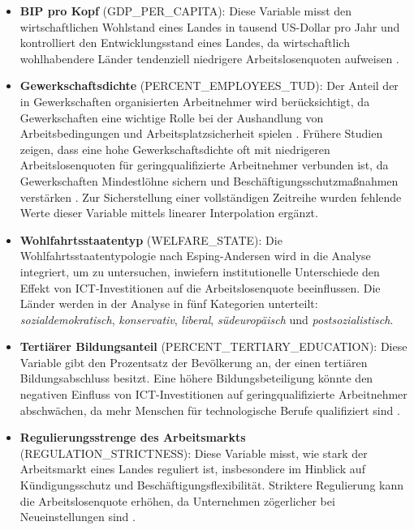 \begin{itemize}
    \item \textbf{\ac{BIP} pro Kopf} (GDP\_PER\_CAPITA): Diese Variable misst den wirtschaftlichen 
    Wohlstand eines Landes in tausend US-Dollar pro Jahr und kontrolliert den Entwicklungsstand 
    eines Landes, da wirtschaftlich wohlhabendere Länder tendenziell niedrigere Arbeitslosenquoten 
    aufweisen \parencite{oecd2022gdp}.
    \item \textbf{Gewerkschaftsdichte} (PERCENT\_EMPLOYEES\_TUD): Der Anteil der in Gewerkschaften 
    organisierten Arbeitnehmer wird berücksichtigt, da Gewerkschaften eine wichtige Rolle bei der 
    Aushandlung von Arbeitsbedingungen und Arbeitsplatzsicherheit spielen \parencite{oecd2022tud}. 
    Frühere Studien zeigen, dass eine hohe Gewerkschaftsdichte oft mit niedrigeren 
    Arbeitslosenquoten für geringqualifizierte Arbeitnehmer verbunden ist, da Gewerkschaften 
    Mindestlöhne sichern und Beschäftigungsschutzmaßnahmen verstärken 
    \parencite[S. 61]{nickell1997unemployment}. Zur Sicherstellung einer vollständigen Zeitreihe 
    wurden fehlende Werte dieser Variable mittels linearer Interpolation ergänzt.
    \item \textbf{Wohlfahrtsstaatentyp} (WELFARE\_STATE): Die Wohlfahrtsstaatentypologie nach 
    Esping-Andersen \parencite{espingandersen1990thethree} wird in die Analyse integriert, 
    um zu untersuchen, inwiefern institutionelle Unterschiede den Effekt von \ac{ICT}-Investitionen 
    auf die Arbeitslosenquote beeinflussen. Die Länder werden in der Analyse in fünf Kategorien 
    unterteilt: \textit{sozialdemokratisch}, \textit{konservativ}, \textit{liberal}, 
    \textit{südeuropäisch} und \textit{postsozialistisch}.
    \item \textbf{Tertiärer Bildungsanteil} (PERCENT\_TERTIARY\_EDUCATION): Diese 
    Variable gibt den Prozentsatz der Bevölkerung an, der einen tertiären Bildungsabschluss 
    besitzt. Eine höhere Bildungsbeteiligung könnte den negativen Einfluss von 
    \ac{ICT}-Investitionen auf geringqualifizierte Arbeitnehmer abschwächen, da mehr Menschen für 
    technologische Berufe qualifiziert sind \parencite{oecd2022education}.
    \item \textbf{Regulierungsstrenge des Arbeitsmarkts} (REGULATION\_STRICTNESS): Diese Variable 
    misst, wie stark der Arbeitsmarkt eines Landes reguliert ist, insbesondere im Hinblick auf 
    Kündigungsschutz und Beschäftigungsflexibilität. Striktere Regulierung kann die 
    Arbeitslosenquote erhöhen, da Unternehmen zögerlicher bei Neueinstellungen sind 
    \parencite{oecd2022regulation}.
\end{itemize}

